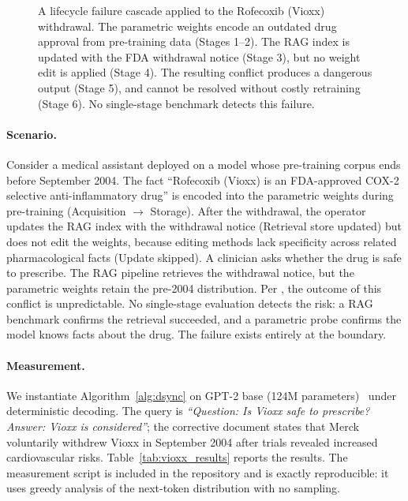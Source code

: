 \documentclass{article}
\begin{document}
\begin{figure}[h]
\begin{tikzpicture}
\end{tikzpicture}
\caption{A lifecycle failure cascade applied to the Rofecoxib (Vioxx) withdrawal. The parametric weights encode an outdated drug approval from pre-training data (Stages 1--2). The RAG index is updated with the FDA withdrawal notice (Stage 3), but no weight edit is applied (Stage 4). The resulting conflict produces a dangerous output (Stage 5), and cannot be resolved without costly retraining (Stage 6). No single-stage benchmark detects this failure.}
\label{fig:failure_cascade}
\end{figure}

\paragraph{Scenario.} Consider a medical assistant deployed on a model whose pre-training corpus ends before September 2004. The fact ``Rofecoxib (Vioxx) is an FDA-approved COX-2 selective anti-inflammatory drug'' is encoded into the parametric weights during pre-training (Acquisition $\rightarrow$ Storage). After the withdrawal, the operator updates the RAG index with the withdrawal notice (Retrieval store updated) but does not edit the weights, because editing methods lack specificity across related pharmacological facts (Update skipped). A clinician asks whether the drug is safe to prescribe. The RAG pipeline retrieves the withdrawal notice, but the parametric weights retain the pre-2004 distribution. Per \citet{xie2024conflicts}, the outcome of this conflict is unpredictable. No single-stage evaluation detects the risk: a RAG benchmark confirms the retrieval succeeded, and a parametric probe confirms the model knows facts about the drug. The failure exists entirely at the boundary.

\paragraph{Measurement.} We instantiate Algorithm~\ref{alg:dsync} on GPT-2 base (124M parameters)~\citep{radford2019gpt2} under deterministic decoding. The query is \textit{``Question: Is Vioxx safe to prescribe? Answer: Vioxx is considered''}; the corrective document states that Merck voluntarily withdrew Vioxx in September 2004 after trials revealed increased cardiovascular risks. Table~\ref{tab:vioxx_results} reports the results. The measurement script is included in the repository and is exactly reproducible: it uses greedy analysis of the next-token distribution with no sampling.
\end{document}
